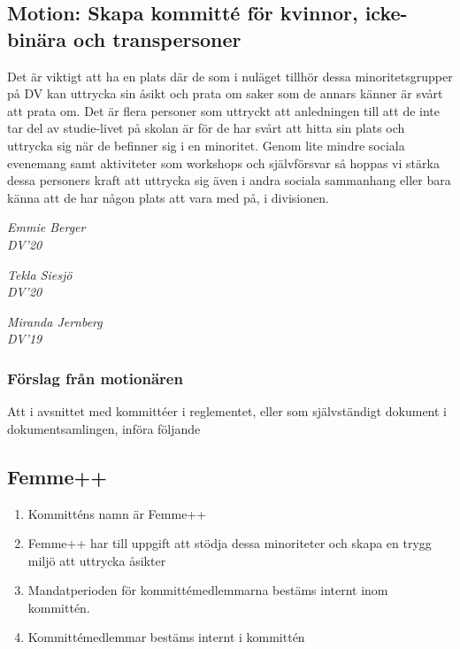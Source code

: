 \documentclass[protokoll]{dvd}
\begin{document}
\subsection{Motion: Skapa kommitté för kvinnor, icke-binära och transpersoner}
    Det är viktigt att ha en plats där de som i nuläget tillhör dessa minoritetsgrupper på DV kan uttrycka sin åsikt och prata om saker som de annars känner är svårt att prata om.
    Det är flera personer som uttryckt att anledningen till att de inte tar del av studie-livet på skolan är för de har svårt att hitta sin plats och uttrycka sig när de befinner sig i en minoritet.
    Genom lite mindre sociala evenemang samt aktiviteter som workshops och självförsvar så hoppas vi stärka dessa personers kraft att uttrycka sig även i andra sociala sammanhang eller bara känna att de har någon plats att vara med på, i divisionen.

\emph{Emmie Berger \\ DV'20}

\emph{Tekla Siesjö \\ DV'20}

\emph{Miranda Jernberg \\ DV'19}


\subsubsection*{Förslag från motionären}

    \begin{attsatser}
        \item Att i avsnittet med kommittéer i reglementet, eller som självständigt dokument i dokumentsamlingen, införa följande

        \begin{displayquote}
            \subsection*{Femme++}
            \begin{enumerate}[label=\arabic* §]
                \item Kommitténs namn är Femme++

                \item Femme++ har till uppgift att stödja dessa minoriteter och skapa en trygg miljö att uttrycka åsikter

                \item Mandatperioden för kommittémedlemmarna bestäms internt inom kommittén.

                \item Kommittémedlemmar bestäms internt i kommittén 
            \end{enumerate}
        \end{displayquote}
    \end{attsatser}
\end{document}
